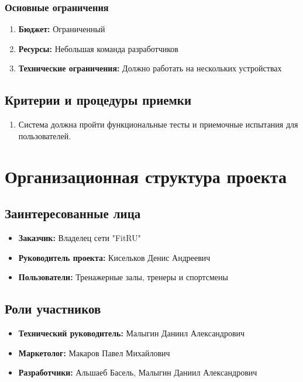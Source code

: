 \documentclass[14pt, russian]{matmex-diploma-custom}
\begin{document}
\subsubsection{Основные ограничения}
\begin{enumerate}
    \item \textbf{Бюджет:} Ограниченный
    \item \textbf{Ресурсы:} Небольшая команда разработчиков
    \item \textbf{Технические ограничения:} Должно работать на нескольких устройствах
\end{enumerate}

\subsection{Критерии и процедуры приемки}
\begin{enumerate}
    \item Система должна пройти функциональные тесты и приемочные испытания для пользователей.
\end{enumerate}


\section{Организационная структура проекта}
\subsection{Заинтересованные лица}
\begin{itemize}
\item \textbf{Заказчик:} Владелец сети "FitRU"
\item \textbf{Руководитель проекта:} Кисельков Денис Андреевич
\item \textbf{Пользователи:} Тренажерные залы, тренеры и спортсмены
\end{itemize}

\subsection{Роли участников}
\begin{itemize}
\item \textbf{Технический руководитель:} Малыгин Даниил Александрович
\item \textbf{Маркетолог:} Макаров Павел Михайлович
\item \textbf{Разработчики:} Альшаеб Басель, Малыгин Даниил Александрович
\end{itemize}
\end{document}

